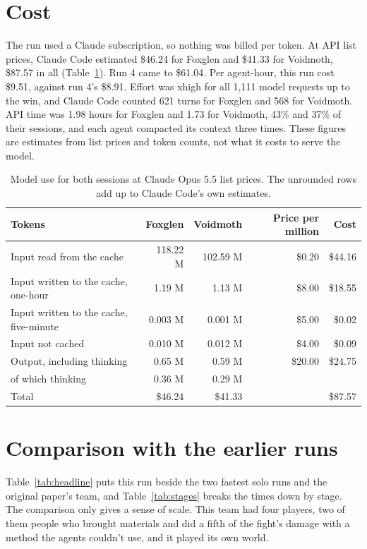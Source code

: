 \documentclass[11pt,a4paper]{article}
\begin{document}
\section{Cost}
\label{sec:cost}

The run used a Claude subscription, so nothing was billed per token. At API list prices, Claude Code estimated \$46.24 for Foxglen and \$41.33 for Voidmoth, \$87.57 in all (Table~\ref{tab:cost}). Run 4 came to \$61.04. Per agent-hour, this run cost \$9.51, against run 4's \$8.91. Effort was xhigh for all 1,111 model requests up to the win, and Claude Code counted 621 turns for Foxglen and 568 for Voidmoth. API time was 1.98 hours for Foxglen and 1.73 for Voidmoth, 43\% and 37\% of their sessions, and each agent compacted its context three times. These figures are estimates from list prices and token counts, not what it costs to serve the model.

\begin{table}[t]
  \caption{Model use for both sessions at Claude Opus 5.5 list prices. The unrounded rows add up to Claude Code's own estimates.}
  \label{tab:cost}
  \small
  \begin{tabularx}{\textwidth}{@{}Xrrrr@{}}
    \toprule
    \textbf{Tokens} & \textbf{Foxglen} & \textbf{Voidmoth} & \textbf{Price per million} & \textbf{Cost} \\
    \midrule
    Input read from the cache & 118.22 M & 102.59 M & \$0.20 & \$44.16 \\
    Input written to the cache, one-hour & 1.19 M & 1.13 M & \$8.00 & \$18.55 \\
    Input written to the cache, five-minute & 0.003 M & 0.001 M & \$5.00 & \$0.02 \\
    Input not cached & 0.010 M & 0.012 M & \$4.00 & \$0.09 \\
    Output, including thinking & 0.65 M & 0.59 M & \$20.00 & \$24.75 \\
    \quad of which thinking & 0.36 M & 0.29 M & & \\
    \midrule
    Total & \$46.24 & \$41.33 & & \$87.57 \\
    \bottomrule
  \end{tabularx}
\end{table}

\section{Comparison with the earlier runs}
\label{sec:compare}

Table~\ref{tab:headline} puts this run beside the two fastest solo runs and the original paper's team, and Table~\ref{tab:stages} breaks the times down by stage. The comparison only gives a sense of scale. This team had four players, two of them people who brought materials and did a fifth of the fight's damage with a method the agents couldn't use, and it played its own world.
\end{document}
